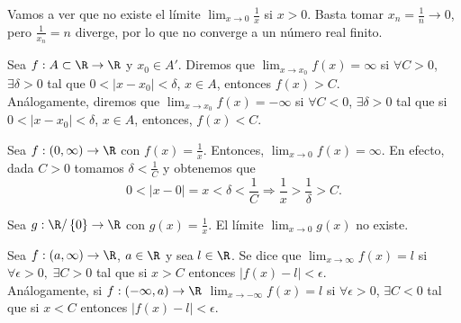 \begin{eg}
\normalfont Vamos a ver que no existe el límite $\displaystyle \lim_{x \to 0}\frac{1}{x} $ si $\displaystyle x > 0 $. Basta tomar $\displaystyle x_{n} = \frac{1}{n} \to 0 $, pero $\displaystyle \frac{1}{x_{n}} = n $ diverge, por lo que no converge a un número real finito.
\end{eg}

\begin{fdefinition}[]
\normalfont Sea $\displaystyle f: A \subset \R \to \R $ y $\displaystyle x_{0} \in A' $. Diremos que $\displaystyle \lim_{x \to x_{0}}f\left(x\right) = \infty $ si $\displaystyle \forall C > 0 $, $\displaystyle \exists \delta > 0 $ tal que $\displaystyle 0 < \left|x - x_{0}\right| < \delta  $, $\displaystyle x \in A $, entonces $\displaystyle f\left(x\right) > C $. \\ 
Análogamente, diremos que $\displaystyle \lim_{x \to x_{0}}f\left(x\right)=-\infty $ si $\displaystyle \forall C < 0 $, $\displaystyle \exists \delta > 0 $ tal que si $\displaystyle 0 < \left|x-x_{0}\right| < \delta  $, $\displaystyle x \in A $, entonces, $\displaystyle f\left(x\right) < C $.
\end{fdefinition}

\begin{eg}
\normalfont Sea $\displaystyle f: \left(0, \infty\right) \to \R $ con $\displaystyle f\left(x\right) = \frac{1}{x} $. Entonces, $\displaystyle \lim_{x \to 0}f\left(x\right) = \infty $. En efecto, dada $\displaystyle C > 0 $ tomamos $\displaystyle \delta < \frac{1}{C} $ y obtenemos que 
\[ 0 < \left|x-0\right| = x < \delta < \frac{1}{C} \Rightarrow \frac{1}{x} > \frac{1}{\delta }> C .\]
\end{eg}
\begin{eg}
	\normalfont Sea $\displaystyle g: \R/ \left\{ 0\right\} \to \R $ con $\displaystyle g\left(x\right) = \frac{1}{x} $. El límite $\displaystyle \lim_{x \to 0}g\left(x\right) $ no existe. 
\end{eg}

\begin{fdefinition}[]
\normalfont Sea $\displaystyle f: \left(a, \infty\right) \to \R $, $\displaystyle a \in \R $ y sea $\displaystyle l \in \R $. Se dice que $\displaystyle \lim_{x \to \infty}f\left(x\right) = l $ si $\displaystyle \forall \epsilon > 0, \; \exists C > 0 $ tal que si $\displaystyle x > C $ entonces $\displaystyle \left|f\left(x\right)-l\right| < \epsilon  $. \\
Análogamente, si $\displaystyle f:\left(-\infty, a\right) \to \R$ $\displaystyle \lim_{x \to -\infty}f\left(x\right) = l $ si $\displaystyle \forall \epsilon > 0 $, $\displaystyle \exists C < 0 $ tal que si $\displaystyle x < C $ entonces $\displaystyle \left|f\left(x\right)-l\right| < \epsilon  $.
\end{fdefinition}

